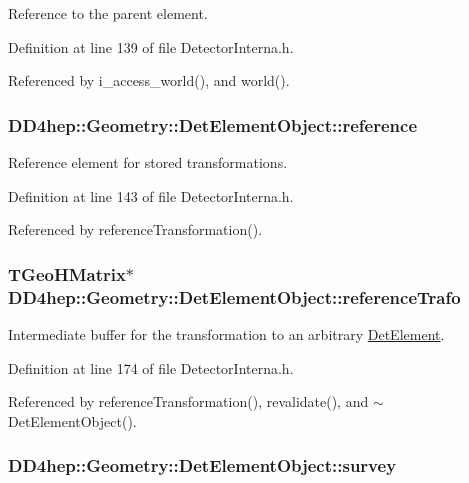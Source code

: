 Reference to the parent element. 

Definition at line 139 of file DetectorInterna.h.

Referenced by i\_\-access\_\-world(), and world().\hypertarget{class_d_d4hep_1_1_geometry_1_1_det_element_object_a6b87ce69ec6c292e36e87f5fed651278}{
\subsubsection[{reference}]{ {\bf DD4hep::Geometry::DetElementObject::reference}}}
\label{class_d_d4hep_1_1_geometry_1_1_det_element_object_a6b87ce69ec6c292e36e87f5fed651278}


Reference element for stored transformations. 

Definition at line 143 of file DetectorInterna.h.

Referenced by referenceTransformation().\hypertarget{class_d_d4hep_1_1_geometry_1_1_det_element_object_af2931f218ee37465cdc62733306d15f3}{
\subsubsection[{referenceTrafo}]{\setlength{\rightskip}{0pt plus 5cm}TGeoHMatrix$\ast$ {\bf DD4hep::Geometry::DetElementObject::referenceTrafo}}}
\label{class_d_d4hep_1_1_geometry_1_1_det_element_object_af2931f218ee37465cdc62733306d15f3}


Intermediate buffer for the transformation to an arbitrary \hyperlink{class_d_d4hep_1_1_geometry_1_1_det_element}{DetElement}. 

Definition at line 174 of file DetectorInterna.h.

Referenced by referenceTransformation(), revalidate(), and $\sim$DetElementObject().\hypertarget{class_d_d4hep_1_1_geometry_1_1_det_element_object_ae01bd959a10eeb236ab0f21d7241a3a1}{
\subsubsection[{survey}]{ {\bf DD4hep::Geometry::DetElementObject::survey}}}
\label{class_d_d4hep_1_1_geometry_1_1_det_element_object_ae01bd959a10eeb236ab0f21d7241a3a1}


